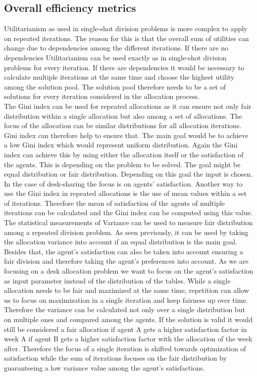\documentclass[german, a4paper, 11pt, oneside]{scrbook}
\begin{document}
\subsection{Overall efficiency metrics}
Utilitarianism as used in single-shot division problems is more complex to apply on repeated iterations. The reason for this is that the overall sum of utilities can change due to dependencies among the different iterations. If there are no dependencies Utilitarianism can be used exactly as in single-shot division problems for every iteration. If there are dependencies it would be necessary to calculate multiple iterations at the same time and choose the highest utility among the solution pool. The solution pool therefore needs to be a set of solutions for every iteration considered in the allocation process.\\
The Gini index can be used for repeated allocations as it can ensure not only fair distribution within a single allocation but also among a set of allocations. The focus of the allocation can be similar distributions for all allocation iterations. Gini index can therefore help to ensure that. The main goal would be to achieve a low Gini index which would represent uniform distribution. Again the Gini index can achieve this by using either the allocation itself or the satisfaction of the agents. This is depending on the problem to be solved. The goal might be equal distribution or fair distribution. Depending on this goal the input is chosen. In the case of desk-sharing the focus is on agents' satisfaction. Another way to use the Gini index in repeated allocations is the use of mean values within a set of iterations. Therefore the mean of satisfaction of the agents of multiple iterations can be calculated and the Gini index can be computed using this value. 
\\
The statistical measurements of Variance can be used to measure fair distribution among a repeated division problem. As seen previously, it can be used by taking the allocation variance into account if an equal distribution is the main goal. Besides that, the agent's satisfaction can also be taken into account ensuring a fair division and therefore taking the agent's preferences into account. As we are focusing on a desk allocation problem we want to focus on the agent's satisfaction as input parameter instead of the distribution of the tables. While a single allocation needs to be fair and maximized at the same time, repetition can allow us to focus on maximization in a single iteration and keep fairness up over time. Therefore the variance can be calculated not only over a single distribution but on multiple ones and compared among the agents. If the solution is valid it would still be considered a fair allocation if agent A gets a higher satisfaction factor in week A if agent B gets a higher satisfaction factor with the allocation of the week after. Therefore the focus of a single iteration is shifted towards optimization of satisfaction while the sum of iterations focuses on the fair distribution by guaranteeing a low variance value among the agent's satisfactions.
\end{document}
